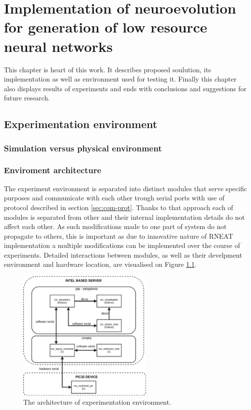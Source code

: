 \FloatBarrier
\chapter{Implementation of neuroevolution for generation of low resource neural networks}
This chapter is heart of this work. It describes proposed soulution, its implementation as 
well as environment used for testing it. Finally this chapter also displays results of 
experiments and ends with conclusions and suggestions for future research.

\FloatBarrier
\section{Experimentation environment}

\FloatBarrier
\subsection{Simulation versus physical environment}

\FloatBarrier
\subsection{Enviroment architecture}
The experiment environment is separated into distinct modules that serve specific purposes and
communicate with each other trough serial ports with use of protocol described in section
\ref{sec:com-prot}.
Thanks to that approach each of modules is separated from other and their internal implementation
details do not affect each other. As such modifications made to one part of system do not propagate
to others, this is important as due to innovative nature of RNEAT implementation a multiple 
modifications can be implemented over the course of experiments.
Detailed interactions between modules, as well as their develpment environment and hardware
location, are visualised on Figure \ref{fig:experiment_arch}.
\begin{figure}[htb] 
	\centering
	\includegraphics[width=0.6\textwidth]{figures/experiment_arch}
	\caption{The architecture of experimentation environment.}
	\label{fig:experiment_arch}
\end{figure}

